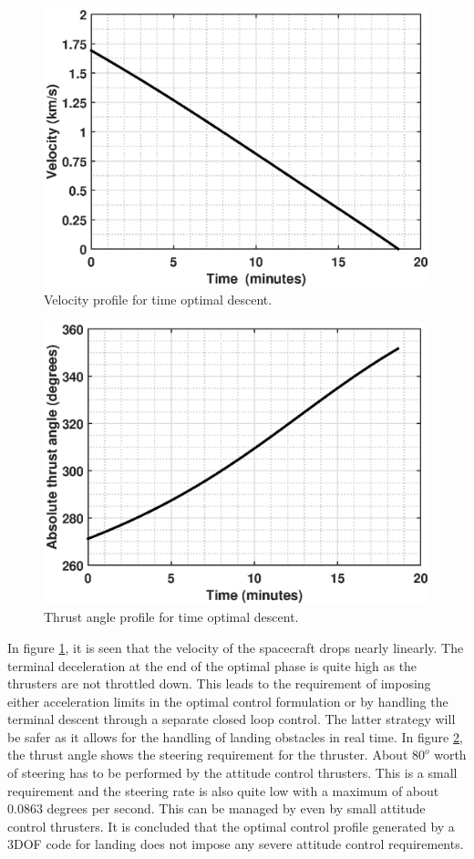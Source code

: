 \begin{figure}[H]
	\centering\includegraphics[width=0.90\linewidth]{Speed.eps}
	\caption{Velocity profile for time optimal descent.}
	\label{speed}
\end{figure}
\begin{figure}[H]
	\centering\includegraphics[width=0.9\linewidth]{Angle.eps}
	\caption{Thrust angle profile for time optimal descent.}
	\label{angle}
\end{figure}
In figure \ref{speed}, it is seen that the velocity of the spacecraft drops nearly linearly. The terminal deceleration at the end of the optimal phase is quite high as the thrusters are not throttled down. This leads to the requirement of imposing either acceleration limits in the optimal control formulation or by handling the terminal descent through a separate closed loop control. The latter strategy will be safer as it allows for the handling of landing obstacles in real time. In figure \ref{angle}, the thrust angle shows the steering requirement for the thruster. About $80^o$ worth of steering has to be performed by the attitude control thrusters. This is a small requirement and the steering rate is also quite low with a maximum of about $0.0863$ degrees per second. This can be managed by even by small attitude control thrusters. It is concluded that the optimal control profile generated by a 3DOF code for landing does not impose any severe attitude control requirements.
